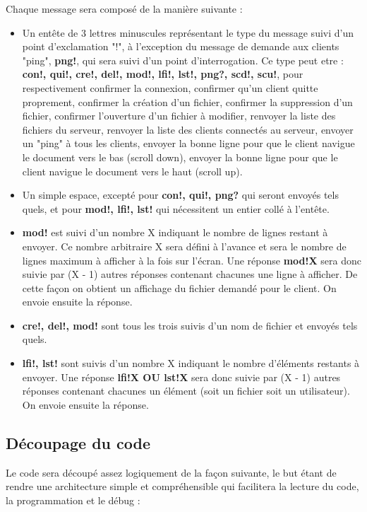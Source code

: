 \documentclass[12pt]{article}
\begin{document}
Chaque message sera composé de la manière suivante :
\begin{itemize}
\item Un entête de 3 lettres minuscules représentant le type du message suivi d'un point d'exclamation "!", à l'exception du message de demande aux clients "ping", \textbf{png!}, qui sera suivi d'un point d'interrogation. Ce type peut etre : \textbf{con!, qui!, cre!, del!, mod!, lfi!, lst!, png?, scd!, scu!}, pour respectivement confirmer la connexion, confirmer qu'un client quitte proprement, confirmer la création d'un fichier, confirmer la suppression d'un fichier, confirmer l'ouverture d'un fichier à modifier, renvoyer la liste des fichiers du serveur, renvoyer la liste des clients connectés au serveur, envoyer un "ping" à tous les clients, envoyer la bonne ligne pour que le client navigue le document vers le bas (scroll down), envoyer la bonne ligne pour que le client navigue le document vers le haut (scroll up).
\item Un simple espace, excepté pour \textbf{con!, qui!, png?} qui seront envoyés tels quels, et pour \textbf{mod!, lfi!, lst!} qui nécessitent un entier collé à l'entête.
\item \textbf{mod!} est suivi d'un nombre X indiquant le nombre de lignes restant à envoyer. Ce nombre arbitraire X sera défini à l'avance et sera le nombre de lignes maximum à afficher à la fois sur l'écran. Une réponse \textbf{mod!X} sera donc suivie par (X - 1) autres réponses contenant chacunes une ligne à afficher. De cette façon on obtient un affichage du fichier demandé pour le client. On envoie ensuite la réponse.
\item \textbf{cre!, del!, mod!} sont tous les trois suivis d'un nom de fichier et envoyés tels quels.
\item \textbf{lfi!, lst!} sont suivis d'un nombre X indiquant le nombre d'éléments restants à envoyer. Une réponse \textbf{lfi!X OU lst!X} sera donc suivie par (X - 1) autres réponses contenant chacunes un élément (soit un fichier soit un utilisateur). On envoie ensuite la réponse.
\end{itemize}

\subsection{Découpage du code}
Le code sera découpé assez logiquement de la façon suivante, le but étant de rendre une architecture simple et compréhensible qui facilitera la lecture du code, la programmation et le débug :\\
\end{document}
